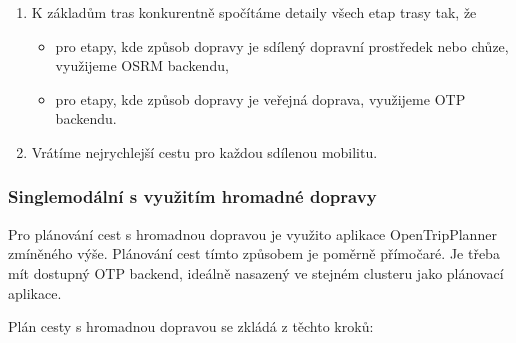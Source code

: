 \documentclass[thesis=M,czech]{FITthesis}[2019/12/23]
\theoremstyle{plain}
\theoremstyle{definition}
\begin{document}
\begin{enumerate}
\begin{itemize}
	\end{itemize}
	\item K základům tras konkurentně spočítáme detaily všech etap trasy tak, že
		\begin{itemize}
			\item pro etapy, kde způsob dopravy je sdílený dopravní prostředek nebo chůze, využijeme OSRM backendu,
			\item pro etapy, kde způsob dopravy je veřejná doprava, využijeme OTP backendu.
		\end{itemize}
	\item Vrátíme nejrychlejší cestu pro každou sdílenou mobilitu.


\end{enumerate}





\subsubsection{Singlemodální s využitím hromadné dopravy}

Pro plánování cest s hromadnou dopravou je využito aplikace OpenTripPlanner zmíněného výše. Plánování cest tímto způsobem je poměrně přímočaré. Je třeba mít dostupný OTP backend, ideálně nasazený ve stejném clusteru jako plánovací aplikace.


Plán cesty s hromadnou dopravou se zkládá z těchto kroků:
\end{document}
